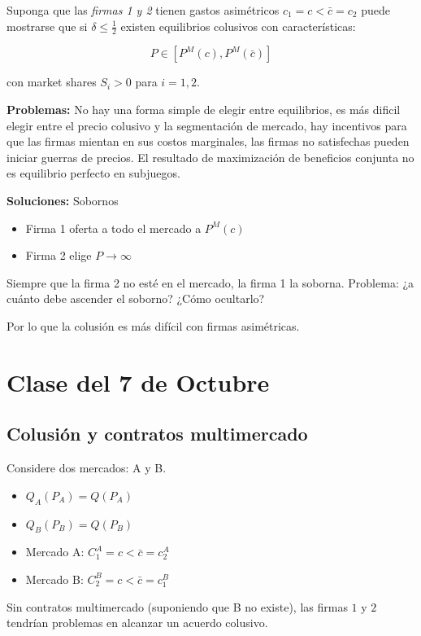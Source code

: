 \documentclass[letterpaper,12pt,twocolumn]{report}
\begin{document}
Suponga que las \textit{firmas 1 y 2} tienen gastos asimétricos $c_1=c<\bar{c}= c_2$ puede mostrarse que si $\delta \leq \frac{1}{2}$ existen equilibrios colusivos con características:

$$ P \in [P^M(c),P^M(\bar{c})] $$

con market shares $S_i>0$ para $i=1,2$.

\textbf{Problemas:} No hay una forma simple de elegir entre equilibrios, es más dificil elegir entre el precio colusivo y la segmentación de mercado, hay incentivos para que las firmas mientan en sus costos marginales, las firmas no satisfechas pueden iniciar guerras de precios. El resultado de maximización de beneficios conjunta no es equilibrio perfecto en subjuegos. 

\textbf{Soluciones:} Sobornos

\begin{itemize}
	\item Firma 1 oferta a todo el mercado a $ P^M(c) $
	\item Firma 2 elige $P \rightarrow \infty$
\end{itemize}

Siempre que la firma 2 no esté en el mercado, la firma 1 la soborna. Problema: ¿a cuánto debe ascender el soborno? ¿Cómo ocultarlo?

Por lo que la colusión es más difícil con firmas asimétricas.

\section{Clase del 7 de Octubre}


\subsection*{Colusión y contratos multimercado}

Considere dos mercados: A y B. 
\begin{itemize}
	\item $ Q_A(P_A)=Q(P_A)$
	\item $Q_B(P_B)=Q(P_B)$
	\item Mercado A: $C_1^{A}=c<\bar{c}=c_2^A$
	\item Mercado B: $C_2^{B}=c<\bar{c}=c_1^B$
\end{itemize}

Sin contratos multimercado (suponiendo que B no existe), las firmas $1$ y $2$ tendrían problemas en alcanzar un acuerdo colusivo.
\end{document}
